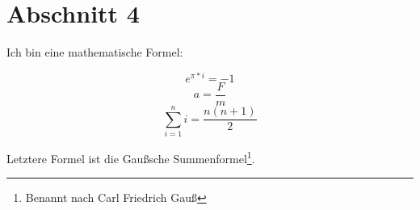 

\section{Abschnitt 4}\label{sec:abschnitt_4}

Ich bin eine mathematische Formel:

\[e^{\pi * i} = -1\]
\[a = \frac{F}{m}\]
\[\sum_{i = 1}^n i = \frac{n(n + 1)}{2}\]

Letztere Formel ist die Gaußsche Summenformel\footnote{Benannt nach Carl Friedrich Gauß}.
